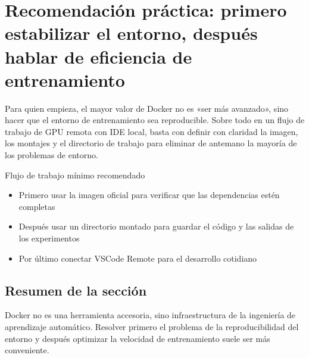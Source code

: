 \section{Recomendación práctica: primero estabilizar el entorno, después hablar de eficiencia de entrenamiento}
Para quien empieza, el mayor valor de Docker no es «ser más avanzado», sino hacer que el entorno de entrenamiento sea reproducible. Sobre todo en un flujo de trabajo de GPU remota con IDE local, basta con definir con claridad la imagen, los montajes y el directorio de trabajo para eliminar de antemano la mayoría de los problemas de entorno.

\begin{knowledgebox}{Flujo de trabajo mínimo recomendado}
\begin{itemize}
  \item Primero usar la imagen oficial para verificar que las dependencias estén completas
  \item Después usar un directorio montado para guardar el código y las salidas de los experimentos
  \item Por último conectar VSCode Remote para el desarrollo cotidiano
\end{itemize}
\end{knowledgebox}

\subsection{Resumen de la sección}
Docker no es una herramienta accesoria, sino infraestructura de la ingeniería de aprendizaje automático. Resolver primero el problema de la reproducibilidad del entorno y después optimizar la velocidad de entrenamiento suele ser más conveniente.

\newpage
